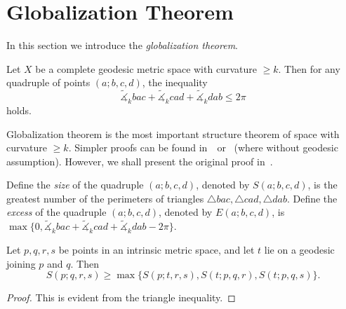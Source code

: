 \section{Globalization Theorem}
In this section we introduce the \emph{globalization theorem}.

\begin{thm}
    Let $X$ be a complete geodesic metric space with curvature $\geq k$.
    Then for any quadruple of points $(a;b,c,d)$, the inequality
    \[\tilde{\measuredangle}_kbac+\tilde{\measuredangle}_kcad+\tilde{\measuredangle}_kdab\leq 2\pi\]
    holds.
\end{thm}

Globalization theorem is the most important structure theorem of space with curvature $\geq k$.
Simpler proofs can be found in~\cite{plautMetricSpacesCurvature2001}~or~\cite{alexanderAlexandrovGeometry2024} (where without geodesic assumption).
However, we shall present the original proof in~\cite{buragoADAlexandrovSpaces1992}.

\begin{defn}
    Define the \emph{size} of the quadruple $(a;b,c,d)$, denoted by $S(a;b,c,d)$, is the greatest number of the perimeters of triangles $\triangle{bac},\triangle{cad},\triangle{dab}$.
    Define the \emph{excess} of the quadruple $(a;b,c,d)$, denoted by $E(a;b,c,d)$, is $\max\{0,\tilde{\measuredangle}_kbac+\tilde{\measuredangle}_kcad+\tilde{\measuredangle}_kdab-2\pi\}$.
\end{defn}

\begin{lem}\label{lem:subadditive of S}
    Let $p,q,r,s$ be points in an intrinsic metric space, and let $t$ lie on a geodesic joining $p$ and $q$.
    Then
    \[S(p;q,r,s)\geq\max\{S(p;t,r,s),S(t;p,q,r),S(t;p,q,s)\}.\]
\end{lem}
\begin{proof}
    This is evident from the triangle inequality.
\end{proof}


